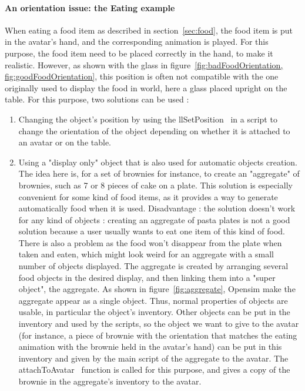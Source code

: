 \paragraph{An orientation issue: the Eating example}
When eating a food item as described in section~\ref{sec:food}, the food item is put in the avatar's hand, and the corresponding animation is played. For this purpose, the food item need to be placed correctly in the hand, to make it realistic. However, as shown with the glass in figure~\ref{fig:badFoodOrientation, fig:goodFoodOrientation}, this position is often not compatible with the one originally used to display the food in world, here a glass placed upright on the table.
For this purpose, two solutions can be used : 
\begin{enumerate}
\item Changing the object's position by using the llSetPosition~\cite{llSetPositionWebsite} in a script to change the orientation of the object depending on whether it is attached to an avatar or on the table. 
\item Using a "display only" object that is also used for automatic objects creation. The idea here is, for a set of brownies for instance, to create an "aggregate" of brownies, such as 7 or 8 pieces of cake on a plate.
This solution is especially convenient for some kind of food items, as it provides a way to generate automatically food when it is used. Disadvantage : the solution doesn't work for any kind of objects : creating an aggregate of pasta plates is not a good solution because a user usually wants to eat one item of this kind of food. There is also a problem as the food won't disappear from the plate when taken and eaten, which might look weird for an aggregate with a small number of objects displayed.  
The aggregate is created by arranging several food objects in the desired display, and then linking them into a "super object", the aggregate. As shown in figure~\ref{fig:aggregate}, Opensim make the aggregate appear as a single object. Thus, normal properties of objects are usable, in particular the object's inventory. Other objects can be put in the inventory and used by the scripts, so the object we want to give to the avatar (for instance, a piece of brownie with the orientation that matches the eating animation with the brownie held in the avatar's hand) can be put in this inventory and given by the main script of the aggregate to the avatar. The attachToAvatar~\cite{llAttachToAvatarWebsite} function is called for this purpose, and gives a copy of the brownie in the aggregate's inventory to the avatar. 
\end{enumerate}

